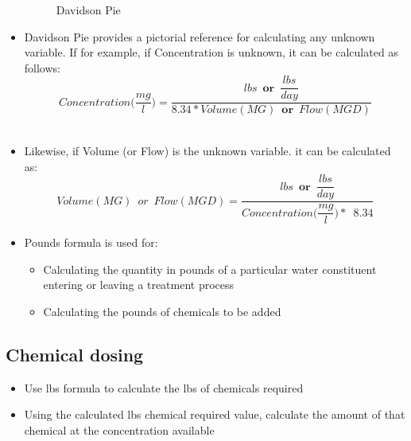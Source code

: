 \begin{itemize}
\begin{figure}[h]
\caption{Davidson Pie}
\end{figure}
\vspace{0.2cm}
\item Davidson Pie provides a pictorial reference for calculating any unknown variable.  If for example, if Concentration is unknown, it can be calculated as follows: \\$$Concentration\Big(\dfrac{mg}{l}\Big)=\dfrac{lbs \enspace \textbf{or} \enspace \dfrac{lbs}{day}}{8.34*Volume(MG) \enspace \textbf{or} \enspace Flow (MGD)}$$\\
\vspace{0.2cm}
\item Likewise, if Volume (or Flow) is the unknown variable. it can be calculated as:  \\$$Volume (MG) \enspace or \enspace Flow(MGD)=\dfrac{lbs \enspace \textbf{or} \enspace \dfrac{lbs}{day}}{Concentration\Big(\dfrac{mg}{l}\Big)* \enspace 8.34  }$$
\vspace{0.2cm}
\item Pounds formula is used for:
\begin{itemize}
\item Calculating the quantity in pounds of a particular water constituent entering or leaving a treatment process
\item Calculating the pounds of chemicals to be added\\
\end{itemize}
\end{itemize}

\subsection{Chemical dosing}
\begin{itemize}
\item Use lbs formula to calculate the lbs of chemicals required\\
\item Using the calculated lbs chemical required value, calculate the amount of that chemical at the concentration available
\end{itemize}

